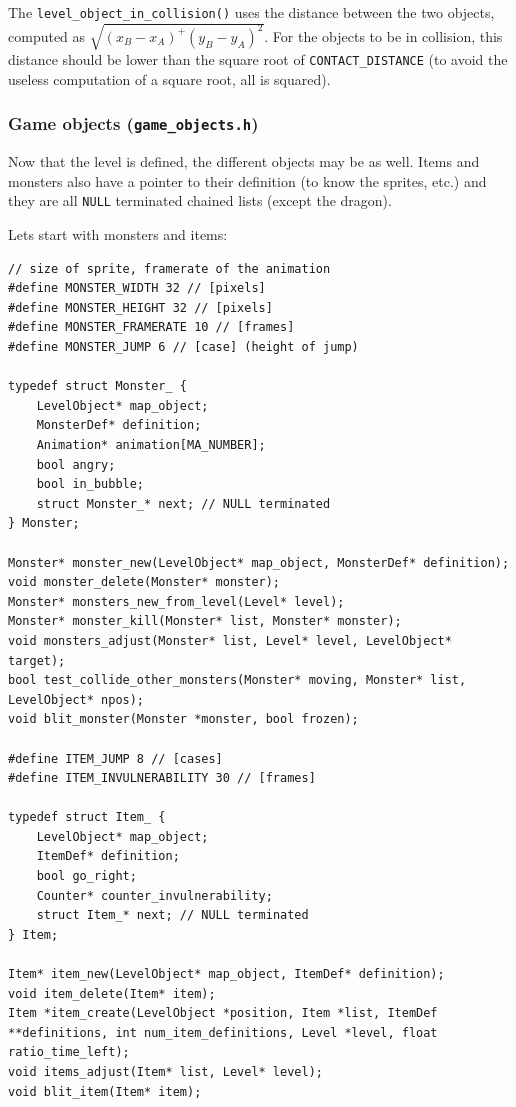 \documentclass[12pt,a4paper]{article}
\newcommand{\cc}[1]{\texttt{#1}}
\begin{document}
The \cc{level_object_in_collision()} uses the distance between the two objects, computed as $\sqrt{(x_B-x_A)^+(y_B-y_A)^2}$. For the objects to be in collision, this distance should be lower than the square root of \cc{CONTACT_DISTANCE} (to avoid the useless computation of a square root, all is squared).

\subsubsection{Game objects (\texttt{game\_objects.h})}

Now that the level is defined, the different objects may be as well. Items and monsters also have a pointer to their definition (to know the sprites, etc.) and they are all \cc{NULL} terminated chained lists (except the dragon). 

Lets start with monsters and items:

\begin{verbatim}
// size of sprite, framerate of the animation
#define MONSTER_WIDTH 32 // [pixels]
#define MONSTER_HEIGHT 32 // [pixels]
#define MONSTER_FRAMERATE 10 // [frames]
#define MONSTER_JUMP 6 // [case] (height of jump)

typedef struct Monster_ {
    LevelObject* map_object;
    MonsterDef* definition;
    Animation* animation[MA_NUMBER];
    bool angry;
    bool in_bubble;
    struct Monster_* next; // NULL terminated
} Monster;

Monster* monster_new(LevelObject* map_object, MonsterDef* definition);
void monster_delete(Monster* monster);
Monster* monsters_new_from_level(Level* level);
Monster* monster_kill(Monster* list, Monster* monster);
void monsters_adjust(Monster* list, Level* level, LevelObject* target);
bool test_collide_other_monsters(Monster* moving, Monster* list, LevelObject* npos);
void blit_monster(Monster *monster, bool frozen);

#define ITEM_JUMP 8 // [cases]
#define ITEM_INVULNERABILITY 30 // [frames]

typedef struct Item_ {
    LevelObject* map_object;
    ItemDef* definition;
    bool go_right;
    Counter* counter_invulnerability;
    struct Item_* next; // NULL terminated
} Item;

Item* item_new(LevelObject* map_object, ItemDef* definition);
void item_delete(Item* item);
Item *item_create(LevelObject *position, Item *list, ItemDef **definitions, int num_item_definitions, Level *level, float ratio_time_left);
void items_adjust(Item* list, Level* level);
void blit_item(Item* item);
\end{verbatim}
\end{document}
